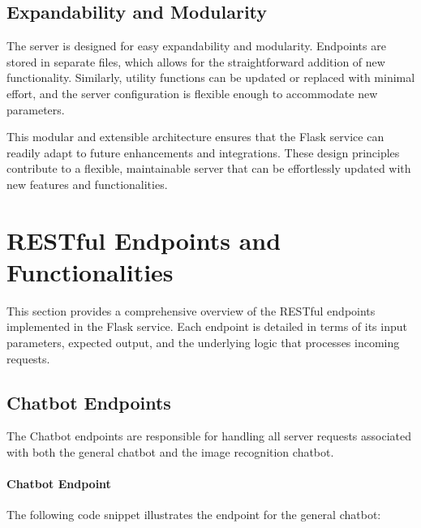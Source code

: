 \subsection{Expandability and Modularity}

The server is designed for easy expandability and modularity. Endpoints are stored in separate files, which allows for the straightforward addition of new functionality. Similarly, utility functions can be updated or replaced with minimal effort, and the server configuration is flexible enough to accommodate new parameters.

This modular and extensible architecture ensures that the Flask service can readily adapt to future enhancements and integrations. These design principles contribute to a flexible, maintainable server that can be effortlessly updated with new features and functionalities.

\section{RESTful Endpoints and Functionalities}
\label{sec:endpoints}

This section provides a comprehensive overview of the RESTful endpoints implemented in the Flask service. Each endpoint is detailed in terms of its input parameters, expected output, and the underlying logic that processes incoming requests.

\subsection{Chatbot Endpoints}

The Chatbot endpoints are responsible for handling all server requests associated with both the general chatbot and the image recognition chatbot.

\paragraph{Chatbot Endpoint}
The following code snippet illustrates the endpoint for the general chatbot:

